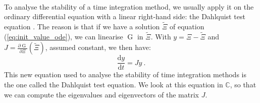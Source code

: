         \paragraph{}
        To analyse the stability of a time integration method, we usually apply it on the ordinary differential equation with a linear right-hand side: the Dahlquist test equation \cite{HairerWanner1996}.
        The reason is that if we have a solution $\tilde{\Xi}$ of equation (\ref{eq:init_value_ode}), we can linearise $\operatorname{G}$ in $\tilde{\Xi}$.
        With $y = \Xi - \tilde{\Xi}$ and $J = \frac{\partial \operatorname{G}}{\partial \Xi}\left(\tilde{\Xi}\right)$, assumed constant, we then have:
        \begin{equation}\label{eq:dahlquist}
          \frac{\mathrm{d} y}{\mathrm{d} t} = J y \ .
        \end{equation}
        This new equation used to analyse the stability of time integration methods is the one called the Dahlquist test equation.
        We look at this equation in $\mathbb{C}$, so that we can compute the eigenvalues and eigenvectors of the matrix $J$.


